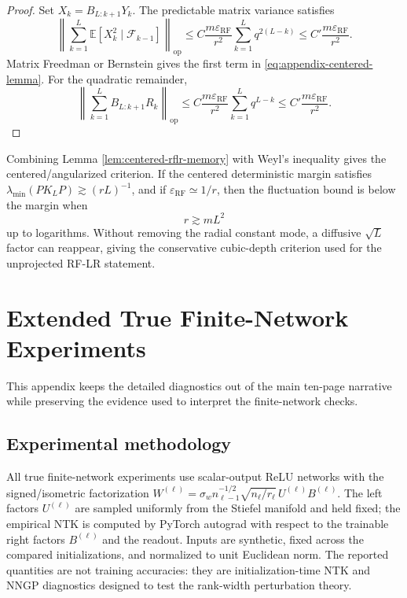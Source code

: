 \documentclass{article}
\newcommand{\E}{\mathbb E}
\newcommand{\op}{\mathrm{op}}
\newcommand{\eps}{\varepsilon}
\newcommand{\RF}{\mathrm{RF}}
\begin{document}
\begin{proof}
Set \(X_k=B_{L:k+1}Y_k\). The predictable matrix variance satisfies
\begin{equation}
\left\|\sum_{k=1}^{L}\E[X_k^2\mid\mathcal F_{k-1}]\right\|_{\op}
\le
C\frac{m\eps_{\RF}}{r^2}\sum_{k=1}^{L}q^{2(L-k)}
\le C'\frac{m\eps_{\RF}}{r^2}.
\end{equation}
Matrix Freedman or Bernstein gives the first term in \eqref{eq:appendix-centered-lemma}. For the quadratic remainder,
\begin{equation}
\left\|\sum_{k=1}^{L}B_{L:k+1}R_k\right\|_{\op}
\le
C\frac{m\eps_{\RF}}{r^2}\sum_{k=1}^{L}q^{L-k}
\le C'\frac{m\eps_{\RF}}{r^2}.
\end{equation}
\end{proof}

Combining Lemma \ref{lem:centered-rflr-memory} with Weyl's inequality gives the centered/angularized criterion. If the centered deterministic margin satisfies \(\lambda_{\min}(PK_LP)\gtrsim (rL)^{-1}\), and if \(\eps_{\RF}\simeq 1/r\), then the fluctuation bound is below the margin when
\begin{equation}
r\gtrsim mL^2
\label{eq:appendix-centered-L2}
\end{equation}
up to logarithms. Without removing the radial constant mode, a diffusive \(\sqrt L\) factor can reappear, giving the conservative cubic-depth criterion used for the unprojected RF-LR statement.

\section{Extended True Finite-Network Experiments}
\label{app:extended-experiments}
This appendix keeps the detailed diagnostics out of the main ten-page narrative while preserving the evidence used to interpret the finite-network checks.

\subsection{Experimental methodology}
All true finite-network experiments use scalar-output ReLU networks with the signed/isometric factorization \(W^{(\ell)}=\sigma_w n_{\ell-1}^{-1/2}\sqrt{n_\ell/r_\ell}\,U^{(\ell)}B^{(\ell)}\). The left factors \(U^{(\ell)}\) are sampled uniformly from the Stiefel manifold and held fixed; the empirical NTK is computed by PyTorch autograd with respect to the trainable right factors \(B^{(\ell)}\) and the readout. Inputs are synthetic, fixed across the compared initializations, and normalized to unit Euclidean norm. The reported quantities are not training accuracies: they are initialization-time NTK and NNGP diagnostics designed to test the rank-width perturbation theory.
\end{document}
